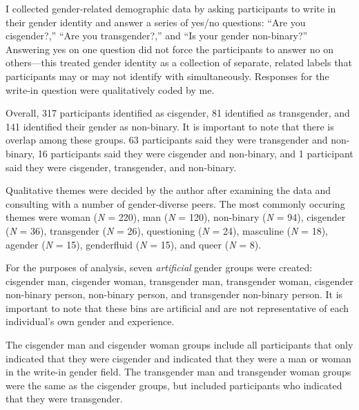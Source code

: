 \documentclass[12pt,twoside]{reedthesis}
\begin{document}
I collected gender-related demographic data by asking participants to write in their gender identity and answer a series of yes/no questions: ``Are you cisgender?,'' ``Are you transgender?,'' and ``Is your gender non-binary?'' Answering yes on one question did not force the participants to answer no on others---this treated gender identity as a collection of separate, related labels that participants may or may not identify with simultaneously. Responses for the write-in question were qualitatively coded by me.

Overall, 317 participants identified as cisgender, 81 identified as transgender, and 141 identified their gender as non-binary. It is important to note that there is overlap among these groups. 63 participants said they were transgender and non-binary, 16 participants said they were cisgender and non-binary, and 1 participant said they were cisgender, transgender, and non-binary.

Qualitative themes were decided by the author after examining the data and consulting with a number of gender-diverse peers. The most commonly occuring themes were woman (\emph{N} = 220), man (\emph{N} = 120), non-binary (\emph{N} = 94), cisgender (\emph{N} = 36), transgender (\emph{N} = 26), questioning (\emph{N} = 24), masculine (\emph{N} = 18), agender (\emph{N} = 15), genderfluid (\emph{N} = 15), and queer (\emph{N} = 8).

For the purposes of analysis, seven \emph{artificial} gender groups were created: cisgender man, cisgender woman, transgender man, transgender woman, cisgender non-binary person, non-binary person, and transgender non-binary person. It is important to note that these bins are artificial and are not representative of each individual's own gender and experience.

The cisgender man and cisgender woman groups include all participants that only indicated that they were cisgender and indicated that they were a man or woman in the write-in gender field. The transgender man and transgender woman groups were the same as the cisgender groups, but included participants who indicated that they were transgender.
\end{document}
